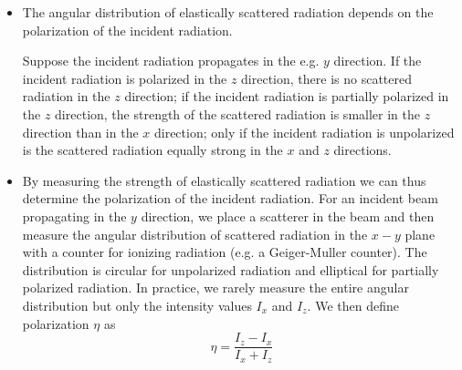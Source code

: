 \documentclass[11pt, a4paper]{article}
\begin{document}
\begin{itemize}
	\item The angular distribution of elastically scattered radiation depends on the polarization of the incident radiation. 
	
	Suppose the incident radiation propagates in the e.g. $ y $ direction. If the incident radiation is polarized in the $ z $ direction, there is no scattered radiation in the $ z $ direction; if the incident radiation is partially polarized in the $ z $ direction, the strength of the scattered radiation is smaller in the $ z $ direction than in the $ x $ direction; only if the incident radiation is unpolarized is the scattered radiation equally strong in the $ x $ and $ z $ directions. 
	
	\item By measuring the strength of elastically scattered radiation we can thus determine the polarization of the incident radiation. For an incident beam propagating in the $ y $ direction, we place a scatterer in the beam and then measure the angular distribution of scattered radiation in the $ x-y $ plane with a counter for ionizing radiation (e.g. a Geiger-Muller counter). The distribution is circular for unpolarized radiation and elliptical for partially polarized radiation. In practice, we rarely measure the entire angular distribution but only the intensity values $ I_{x} $ and $ I_{z} $. We then define polarization $ \eta $ as
	\begin{equation*}
		\eta = \frac{I_{z} - I_{x}}{I_{x} + I_{z}}
	\end{equation*}
\end{itemize}
\end{document}
